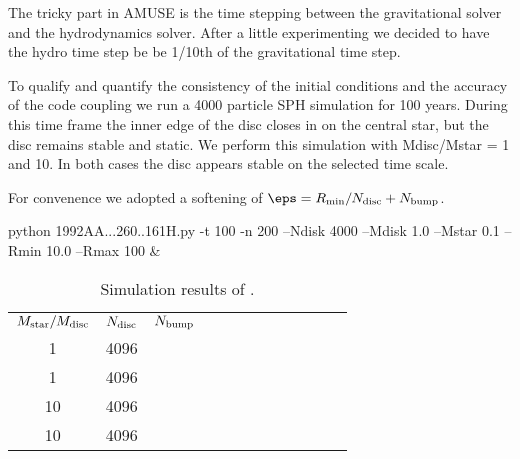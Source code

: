 The tricky part in AMUSE is the time stepping between the
gravitational solver and the hydrodynamics solver.  After a little
experimenting we decided to have the hydro time step be be 1/10th of
the gravitational time step.

To qualify and quantify the consistency of the initial conditions and
the accuracy of the code coupling we run a 4000 particle SPH
simulation for 100 years. During this time frame the inner edge of the
disc closes in on the central star, but the disc remains stable and
static. We perform this simulation with Mdisc/Mstar = 1 and 10.  In
both cases the disc appears stable on the selected time scale.

For convenence we adopted a softening of $\eps = R_{\rm min}/N_{\rm
  disc}+N_{\rm bump}$.

python 1992AA...260..161H.py -t 100 -n 200 --Ndisk 4000 --Mdisk 1.0 --Mstar 0.1 --Rmin 10.0 --Rmax 100 &


\begin{table}[htbp]
\begin{center}
\begin{tabular}{crcccccccccc}\hline
$M_{\rm star}/M_{\rm disc}$ & $N_{\rm disc}$ & $N_{\rm bump}$  \\
1  & 4096 \\
1  & 4096 \\
10 & 4096 \\
10 & 4096 \\
\hline
\hline
\end{tabular}
\caption{\label{Tab:Timings} 
Simulation results of \cite{1992A&A...260..161H}.
 }
\end{center}
\end{table}


\cite{1994A&A...288..807H}

%
